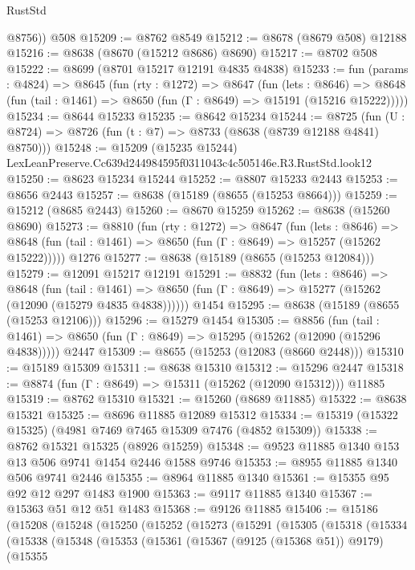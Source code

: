 \begin{lexlean}{RustStd}
\begin{coremodule}
        @8756))
    @508
@15209 := @8762 @8549
@15212 := @8678 (@8679 @508) @12188
@15216 := @8638 (@8670 (@15212 @8686) @8690)
@15217 := @8702 @508
@15222 := @8699 (@8701 @15217 @12191 @4835 @4838)
@15233 := fun (params : @4824) =>
  @8645
    (fun (rty : @1272) =>
    @8647
      (fun (lets : @8646) =>
      @8648 (fun (tail : @1461) => @8650 (fun (Γ : @8649) => @15191 (@15216 @15222)))))
@15234 := @8644 @15233
@15235 := @8642 @15234
@15244 := @8725
    (fun (U : @8724) => @8726 (fun (t : @7) => @8733 (@8638 (@8739 @12188 @4841) @8750)))
@15248 := @15209 (@15235 @15244) LexLeanPreserve.Cc639d244984595f0311043c4c505146e.R3.RustStd.look12
@15250 := @8623 @15234 @15244
@15252 := @8807 @15233 @2443
@15253 := @8656 @2443
@15257 := @8638 (@15189 (@8655 (@15253 @8664)))
@15259 := @15212 (@8685 @2443)
@15260 := @8670 @15259
@15262 := @8638 (@15260 @8690)
@15273 := @8810
    (fun (rty : @1272) =>
    @8647
      (fun (lets : @8646) =>
      @8648 (fun (tail : @1461) => @8650 (fun (Γ : @8649) => @15257 (@15262 @15222)))))
    @1276
@15277 := @8638 (@15189 (@8655 (@15253 @12084)))
@15279 := @12091 @15217 @12191
@15291 := @8832
    (fun (lets : @8646) =>
    @8648
      (fun (tail : @1461) =>
      @8650 (fun (Γ : @8649) => @15277 (@15262 (@12090 (@15279 @4835 @4838))))))
    @1454
@15295 := @8638 (@15189 (@8655 (@15253 @12106)))
@15296 := @15279 @1454
@15305 := @8856
    (fun (tail : @1461) => @8650 (fun (Γ : @8649) => @15295 (@15262 (@12090 (@15296 @4838)))))
    @2447
@15309 := @8655 (@15253 (@12083 (@8660 @2448)))
@15310 := @15189 @15309
@15311 := @8638 @15310
@15312 := @15296 @2447
@15318 := @8874 (fun (Γ : @8649) => @15311 (@15262 (@12090 @15312))) @11885
@15319 := @8762 @15310
@15321 := @15260 (@8689 @11885)
@15322 := @8638 @15321
@15325 := @8696 @11885 @12089 @15312
@15334 := @15319 (@15322 @15325) (@4981 @7469 @7465 @15309 @7476 (@4852 @15309))
@15338 := @8762 @15321 @15325 (@8926 @15259)
@15348 := @9523 @11885 @1340 @153 @13 @506 @9741 @1454 @2446 @1588 @9746
@15353 := @8955 @11885 @1340 @506 @9741 @2446
@15355 := @8964 @11885 @1340
@15361 := @15355 @95 @92 @12 @297 @1483 @1900
@15363 := @9117 @11885 @1340
@15367 := @15363 @51 @12 @51 @1483
@15368 := @9126 @11885
@15406 := @15186
    (@15208
      (@15248
        (@15250
          (@15252
            (@15273
              (@15291
                (@15305
                  (@15318
                    (@15334
                      (@15338
                        (@15348
                          (@15353
                            (@15361
                              (@15367 (@9125 (@15368 @51)) @9179)
                              (@15355

\end{coremodule}
\end{lexlean}
